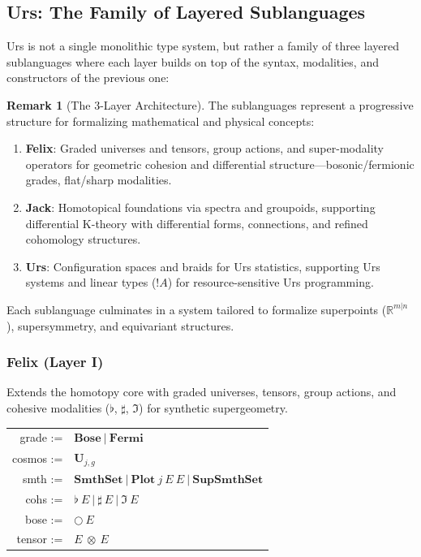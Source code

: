 \documentclass{article}
\theoremstyle{definition}
\newtheorem{remark}[definition]{Remark}
\theoremstyle{plain}
\begin{document}
\subsection{Urs: The Family of Layered Sublanguages}
Urs is not a single monolithic type system, but rather a family of three
layered sublanguages where each layer builds on top of the syntax, modalities, and constructors of the previous one:

\begin{remark}[The 3-Layer Architecture]
The sublanguages represent a progressive structure for formalizing mathematical and
physical concepts:
\begin{enumerate}
  \item \textbf{Felix}: Graded universes and tensors, group
    actions, and super-modality operators for geometric cohesion and
    differential structure---bosonic/fermionic grades, flat/sharp modalities.
  \item \textbf{Jack}: Homotopical foundations via
    spectra and groupoids, supporting differential K-theory with differential
    forms, connections, and refined cohomology structures.
  \item \textbf{Urs}: Configuration spaces and braids for Urs
    statistics, supporting Urs systems and linear types ($!A$) for
    resource-sensitive Urs programming.
\end{enumerate}
Each sublanguage culminates in a system tailored to formalize superpoints
($\mathbb{R}^{m|n}$), supersymmetry, and equivariant structures.
\end{remark}

\newpage
\subsubsection{Felix (Layer I)}
Extends the homotopy core with graded universes, tensors, group actions, and cohesive modalities ($\flat$, $\sharp$, $\Im$) for synthetic supergeometry.
\begin{table}[ht!]
\centering
\begin{tabular}{rl}
   grade :=&$\textbf{Bose}\ |\ \textbf{Fermi}$ \\
  cosmos :=&$\textbf{U}_{j,g}$ \\
    smth :=&$\textbf{SmthSet}\ |\ \textbf{Plot}\ j\ E\ E\ |\ \textbf{SupSmthSet}$ \\
    cohs :=&$\flat\ E\ |\ \sharp\ E\ |\ \Im\ E$ \\
    bose :=&$\bigcirc\ E$ \\
  tensor :=&$E\ \otimes\ E$ \\
\end{tabular}
\end{table}
\end{document}
